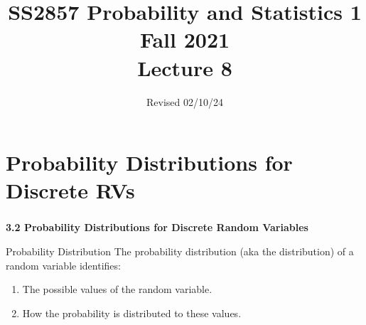 

\newcommand{\lecturenum}{8}

\title[SS2857 -- Lecture 8]{SS2857 Probability and Statistics 1\\
  Fall 2021\\
  \vspace{.2in}
  Lecture 8}

\date{Revised 02/10/24}





{

\begin{frame}
  \addtocounter{framenumber}{-1}

  \maketitle
\end{frame}
}

\section{Probability Distributions for Discrete RVs}

\begin{frame}
  \frametitle{}

  \begin{center}
    \Large{\textbf{3.2 Probability Distributions for Discrete Random Variables}}
  \end{center}

\end{frame}

\begin{frame}
  \begin{block}{Probability Distribution}
  The probability distribution (aka the distribution) of a random variable identifies:
  \begin{enumerate}[1)]
  \item The possible values of the random variable.
  \item How the probability is distributed to these values.
  \end{enumerate}
  \end{block}
\end{frame}

